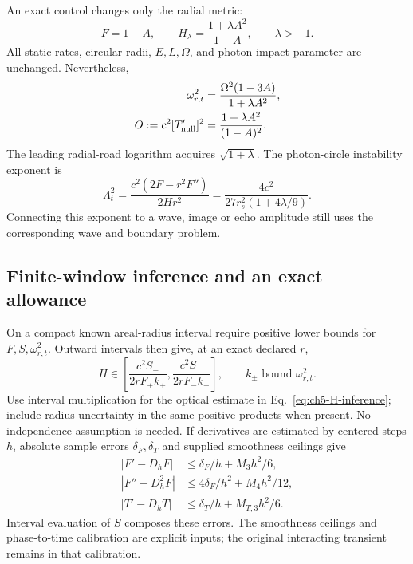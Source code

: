 \documentclass[10pt,twocolumn,letterpaper]{article}
\begin{document}
An exact control changes only the radial metric:
\[
 F=1-A,\qquad H_\lambda=\frac{1+\lambda A^2}{1-A},
 \qquad\lambda>-1.
\]
All static rates, circular radii, $E,L,\Omega$, and photon impact
parameter are unchanged. Nevertheless,
\begin{align}
 \omega_{r,t}^2&=\frac{\Omega^2(1-3A)}{1+\lambda A^2},\nonumber\\
 O:=c^2[T'_{\rm null}]^2&=\frac{1+\lambda A^2}{(1-A)^2}.
 \label{eq:ch5-H-only-control}
\end{align}
The leading radial-road logarithm acquires $\sqrt{1+\lambda}$.
The photon-circle instability exponent is
\[
 \Lambda_t^2=\frac{c^2(2F-r^2F'')}{2Hr^2}
       =\frac{4c^2}{27r_s^2(1+4\lambda/9)}.
\]
Connecting this exponent to a wave, image or echo amplitude still uses
the corresponding wave and boundary problem.

\subsection{Finite-window inference and an exact allowance}
On a compact known areal-radius interval require positive lower
bounds for $F,S,\omega_{r,t}^2$. Outward intervals then give, at an
exact declared $r$,
\[
 H\in\left[\frac{c^2S_-}{2rF_+k_+},
             \frac{c^2S_+}{2rF_-k_-}\right],
 \qquad k_\pm\text{ bound }\omega_{r,t}^2.
\]
Use interval multiplication for the optical estimate in
Eq.~\eqref{eq:ch5-H-inference}; include radius uncertainty in the same
positive products when present. No independence assumption is needed.
If derivatives are estimated by centered steps $h$, absolute sample
errors $\delta_F,\delta_T$ and supplied smoothness ceilings give
\begin{align*}
 |F'-D_hF|&\leq\delta_F/h+M_3h^2/6,\\
 |F''-D_h^2F|&\leq4\delta_F/h^2+M_4h^2/12,\\
 |T'-D_hT|&\leq\delta_T/h+M_{T,3}h^2/6.
\end{align*}
Interval evaluation of $S$ composes these errors. The smoothness
ceilings and phase-to-time calibration are explicit inputs; the
original interacting transient remains in that calibration.
\end{document}
